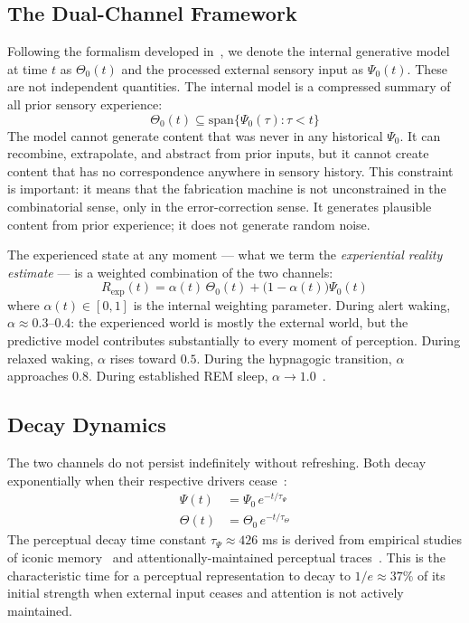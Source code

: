 \subsection{The Dual-Channel Framework}

Following the formalism developed in~\cite{author_dream}, we denote the internal generative model at time $t$ as $\Theta_0(t)$ and the processed external sensory input as $\Psi_0(t)$. These are not independent quantities. The internal model is a compressed summary of all prior sensory experience:
%
\begin{equation}
\Theta_0(t) \subseteq \mathrm{span}\{\Psi_0(\tau) : \tau < t\}
\end{equation}
%
The model cannot generate content that was never in any historical $\Psi_0$. It can recombine, extrapolate, and abstract from prior inputs, but it cannot create content that has no correspondence anywhere in sensory history. This constraint is important: it means that the fabrication machine is not unconstrained in the combinatorial sense, only in the error-correction sense. It generates plausible content from prior experience; it does not generate random noise.

The experienced state at any moment --- what we term the \textit{experiential reality estimate} --- is a weighted combination of the two channels:
%
\begin{equation}
R_{\mathrm{exp}}(t) = \alpha(t)\,\Theta_0(t) + \bigl(1-\alpha(t)\bigr)\Psi_0(t)
\label{eq:reality_estimate}
\end{equation}
%
where $\alpha(t) \in [0, 1]$ is the internal weighting parameter. During alert waking, $\alpha \approx 0.3$--$0.4$: the experienced world is mostly the external world, but the predictive model contributes substantially to every moment of perception. During relaxed waking, $\alpha$ rises toward $0.5$. During the hypnagogic transition, $\alpha$ approaches $0.8$. During established REM sleep, $\alpha \to 1.0$~\cite{author_dream}.

\subsection{Decay Dynamics}

The two channels do not persist indefinitely without refreshing. Both decay exponentially when their respective drivers cease~\cite{author_dream}:
%
\begin{align}
\Psi(t) &= \Psi_0 \, e^{-t/\tau_\Psi} \\[4pt]
\Theta(t) &= \Theta_0 \, e^{-t/\tau_\Theta}
\end{align}
%
The perceptual decay time constant $\tau_\Psi \approx 426$ ms is derived from empirical studies of iconic memory~\cite{sperling1960} and attentionally-maintained perceptual traces~\cite{magnussen2000}. This is the characteristic time for a perceptual representation to decay to $1/e \approx 37\%$ of its initial strength when external input ceases and attention is not actively maintained.

